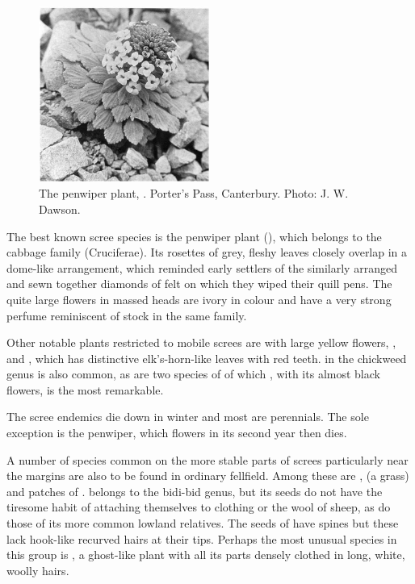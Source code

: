 \begin{figure}
	\includegraphics[width=0.5\textwidth]{graphics/figure112penwiper.jpg}
	\centering
	\caption[The penwiper plant]{The penwiper plant, .
Porter's Pass, Canterbury.
	Photo: J. W. Dawson.}
	\label{fig:112penwiper}
\end{figure}

The best known scree species is the penwiper plant (), which belongs to the cabbage family (Cruciferae).
Its rosettes of grey, fleshy leaves closely overlap in a dome-like arrangement, which reminded early settlers of the similarly arranged and sewn together diamonds of felt on which they wiped their quill pens.
The quite large flowers in massed heads are ivory in colour and have a very strong perfume reminiscent of stock in the same family.

Other notable plants restricted to mobile screes are  with large yellow flowers, , and , which has distinctive elk's-horn-like leaves with red teeth.  in the chickweed genus is also common, as are two species of  of which , with its almost black flowers, is the most remarkable.

The scree endemics die down in winter and most are perennials.
The sole exception is the penwiper, which flowers in its second year then dies.

A number of species common on the more stable parts of screes particularly near the margins are also to be found in ordinary fellfield.
Among these are ,  (a grass) and patches of .  belongs to the bidi-bid genus, but its seeds do not have the tiresome habit of attaching themselves to clothing or the wool of sheep, as do those of its more common lowland relatives.
The seeds of  have spines but these lack hook-like recurved hairs at their tips.
Perhaps the most unusual species in this group is , a ghost-like plant with all its parts densely clothed in long, white, woolly hairs.

